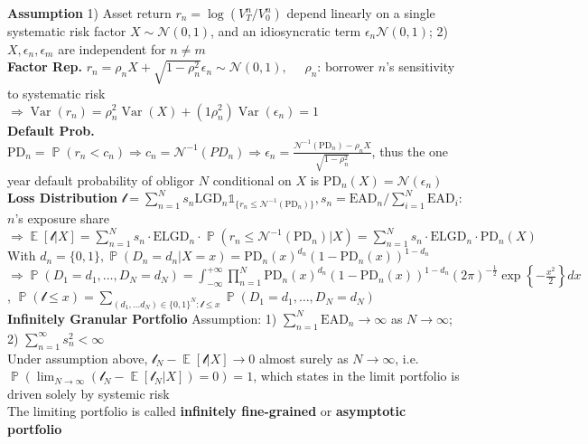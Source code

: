 \documentclass[12pt,landscape, a4paper]{article}
\theoremstyle{remark}
\newcommand{\var}{\operatorname{Var}}
\newcommand{\E}{\operatorname{\mathbb{E}}}
\newcommand{\prob}{\operatorname{\mathbb{P}}}
\newcommand{\PD}{\mathrm{PD}}
\newcommand{\EAD}{\mathrm{EAD}}
\newcommand{\LGD}{\mathrm{LGD}}
\newcommand{\N}{\mathcal{N}}
\begin{document}
\begin{multicols*}{3}
\textbf{Assumption} 1) Asset return $r_n = \log (V^n_T / V^n_0)$ depend linearly on a single systematic risk factor $X \sim \N (0, 1)$, and an idiosyncratic term $\epsilon_n \N (0, 1)$; 2) $X, \epsilon_n, \epsilon_m$ are independent for $n \neq m$\\
\textbf{Factor Rep.} $r_n = \rho_n X + \sqrt{1 - \rho_n^2} \epsilon_n \sim \N (0, 1), \quad$ $\rho_n$: borrower $n$'s sensitivity to systematic risk\\
$\Rightarrow \var (r_n) = \rho^2_n \var (X ) + (1\rho^2_n)\var (\epsilon_n) = 1$\\
\textbf{Default Prob.} $\PD_n = \prob (r_n < c_n) \Rightarrow c_n = \N^{-1} (PD_n) \Rightarrow \epsilon_n = \frac{\N^{-1} (\PD_n) - \rho_n X }{\sqrt{1-\rho^2_n}}$, thus the one year default probability of obligor $N$ conditional on $X$ is $\PD_n (X) = \N \left(\epsilon_n \right)$\\

\textbf{Loss Distribution} $\mathscr{l} = \sum^N_{n=1} s_n \LGD_n \mathds{1}_{\{r_n \leq \N^{-1} (\PD_n) \}}, s_n = \EAD_n / \sum^N_{i=1} \EAD_i $: $n$'s exposure share\\
$\Rightarrow \E [\mathscr{l} \lvert X] = \sum^N_{n=1}  s_n \cdot\mathrm{ELGD}_n \cdot\prob (r_n \leq \N^{-1} (\PD_n) \lvert X ) = \sum^N_{n=1} s_n \cdot\mathrm{ELGD}_n \cdot\PD_n (X) $\\
With $d_n = \{0, 1\}, \prob (D_n = d_n \lvert X=x) = \PD_n (x)^{d_n} (1- \PD_n (x))^{1-d_n} $\\
$\Rightarrow \prob (D_1 = d_1, \dots, D_N = d_N) =\int_{-\infty}^{+\infty} \prod^N_{n=1} \PD_n (x)^{d_n} (1- \PD_n (x))^{1-d_n} (2\pi)^{-\frac{1}{2}} \exp \left\{-\frac{x^2}{2} \right\} dx $,
$\prob (\mathscr{l} \leq x) = \sum_{(d_1, \dots d_N) \in \{0, 1 \}^N: \mathscr{l}\leq x }\prob (D_1 = d_1, \dots, D_N = d_N) $\\

\textbf{Infinitely Granular Portfolio} Assumption: 1) $\sum^N_{n=1} \EAD_n \to \infty $ as $N \to \infty$; 2) $\sum^{\infty}_{n=1} s^2_n < \infty $\\
Under assumption above, $\mathscr{l}_N - \E [\mathscr{l}\lvert X] \to 0 $ almost surely as $N \to \infty$, i.e. $\prob \left(\lim_{N\to\infty} (\mathscr{l}_N - \E [\mathscr{l}_N \lvert X]) = 0 \right) = 1$, which states in the limit portfolio is driven solely by systemic risk\\
The limiting portfolio is called \textbf{infinitely fine-grained} or \textbf{asymptotic portfolio}\\


\end{multicols*}
\end{document}
